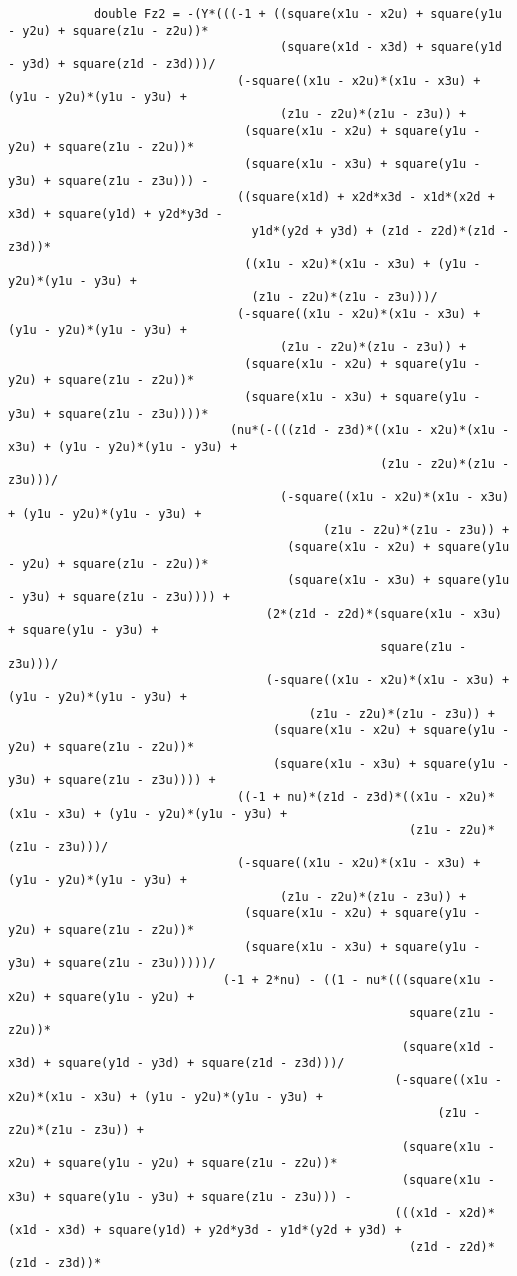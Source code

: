 \begin{lstlisting}
			double Fz2 = -(Y*(((-1 + ((square(x1u - x2u) + square(y1u - y2u) + square(z1u - z2u))*
									  (square(x1d - x3d) + square(y1d - y3d) + square(z1d - z3d)))/
								(-square((x1u - x2u)*(x1u - x3u) + (y1u - y2u)*(y1u - y3u) + 
									  (z1u - z2u)*(z1u - z3u)) + 
								 (square(x1u - x2u) + square(y1u - y2u) + square(z1u - z2u))*
								 (square(x1u - x3u) + square(y1u - y3u) + square(z1u - z3u))) - 
								((square(x1d) + x2d*x3d - x1d*(x2d + x3d) + square(y1d) + y2d*y3d - 
								  y1d*(y2d + y3d) + (z1d - z2d)*(z1d - z3d))*
								 ((x1u - x2u)*(x1u - x3u) + (y1u - y2u)*(y1u - y3u) + 
								  (z1u - z2u)*(z1u - z3u)))/
								(-square((x1u - x2u)*(x1u - x3u) + (y1u - y2u)*(y1u - y3u) + 
									  (z1u - z2u)*(z1u - z3u)) + 
								 (square(x1u - x2u) + square(y1u - y2u) + square(z1u - z2u))*
								 (square(x1u - x3u) + square(y1u - y3u) + square(z1u - z3u))))*
							   (nu*(-(((z1d - z3d)*((x1u - x2u)*(x1u - x3u) + (y1u - y2u)*(y1u - y3u) + 
													(z1u - z2u)*(z1u - z3u)))/
									  (-square((x1u - x2u)*(x1u - x3u) + (y1u - y2u)*(y1u - y3u) + 
											(z1u - z2u)*(z1u - z3u)) + 
									   (square(x1u - x2u) + square(y1u - y2u) + square(z1u - z2u))*
									   (square(x1u - x3u) + square(y1u - y3u) + square(z1u - z3u)))) + 
									(2*(z1d - z2d)*(square(x1u - x3u) + square(y1u - y3u) + 
													square(z1u - z3u)))/
									(-square((x1u - x2u)*(x1u - x3u) + (y1u - y2u)*(y1u - y3u) + 
										  (z1u - z2u)*(z1u - z3u)) + 
									 (square(x1u - x2u) + square(y1u - y2u) + square(z1u - z2u))*
									 (square(x1u - x3u) + square(y1u - y3u) + square(z1u - z3u)))) + 
								((-1 + nu)*(z1d - z3d)*((x1u - x2u)*(x1u - x3u) + (y1u - y2u)*(y1u - y3u) + 
														(z1u - z2u)*(z1u - z3u)))/
								(-square((x1u - x2u)*(x1u - x3u) + (y1u - y2u)*(y1u - y3u) + 
									  (z1u - z2u)*(z1u - z3u)) + 
								 (square(x1u - x2u) + square(y1u - y2u) + square(z1u - z2u))*
								 (square(x1u - x3u) + square(y1u - y3u) + square(z1u - z3u)))))/
							  (-1 + 2*nu) - ((1 - nu*(((square(x1u - x2u) + square(y1u - y2u) + 
														square(z1u - z2u))*
													   (square(x1d - x3d) + square(y1d - y3d) + square(z1d - z3d)))/
													  (-square((x1u - x2u)*(x1u - x3u) + (y1u - y2u)*(y1u - y3u) + 
															(z1u - z2u)*(z1u - z3u)) + 
													   (square(x1u - x2u) + square(y1u - y2u) + square(z1u - z2u))*
													   (square(x1u - x3u) + square(y1u - y3u) + square(z1u - z3u))) - 
													  (((x1d - x2d)*(x1d - x3d) + square(y1d) + y2d*y3d - y1d*(y2d + y3d) + 
														(z1d - z2d)*(z1d - z3d))*

\end{lstlisting}
